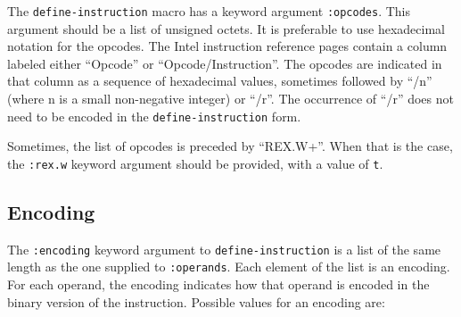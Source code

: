 The \texttt{define-instruction} macro has a keyword argument
\texttt{:opcodes}.  This argument should be a list of unsigned octets.
It is preferable to use hexadecimal notation for the opcodes.  The
Intel instruction reference pages contain a column labeled either
``Opcode'' or ``Opcode/Instruction''.  The opcodes are indicated in
that column as a sequence of hexadecimal values, sometimes followed by
``/n'' (where n is a small non-negative integer) or ``/r''.  The
occurrence of ``/r'' does not need to be encoded in the
\texttt{define-instruction} form.

Sometimes, the list of opcodes is preceded by ``REX.W+''.  When that
is the case, the \texttt{:rex.w} keyword argument should be provided,
with a value of \texttt{t}.

\subsection{Encoding}

The \texttt{:encoding} keyword argument to \texttt{define-instruction}
is a list of the same length as the one supplied to
\texttt{:operands}.  Each element of the list is an encoding.  For
each operand, the encoding indicates how that operand is encoded in
the binary version of the instruction.  Possible values for an
encoding are:

